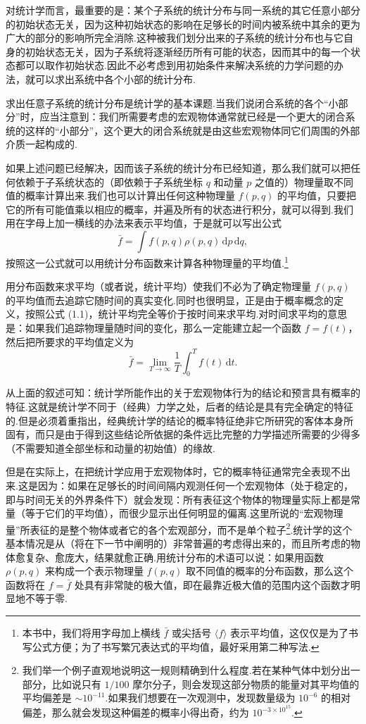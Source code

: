对统计学而言，最重要的是：某个子系统的统计分布与同一系统的其它任意小部分的初始状态无关，因为这种初始状态的影响在足够长的时间内被系统中其余的更为广大的部分的影响所完全消除.这种被我们划分出来的子系统的统计分布也与它自身的初始状态无关，因为子系统将逐渐经历所有可能的状态，因而其中的每一个状态都可以取作初始状态.因此不必考虑到用初始条件来解决系统的力学问题的办法，就可以求出系统中各个小部的统计分布.

求出任意子系统的统计分布是统计学的基本课题.当我们说闭合系统的各个“小部分”时，应当注意到：我们所需要考虑的宏观物体通常就已经是一个更大的闭合系统的这样的“小部分”，这个更大的闭合系统就是由这些宏观物体同它们周围的外部介质一起构成的.

如果上述问题已经解决，因而该子系统的统计分布已经知道，那么我们就可以把任何依赖于子系统状态的（即依赖于子系统坐标 $q$ 和动量 $p$ 之值的）物理量取不同值的概率计算出来.我们也可以计算出任何这种物理量 $f(p,q)$ 的平均值，只要把它的所有可能值乘以相应的概率，并遍及所有的状态进行积分，就可以得到.我们用在字母上加一横线的办法来表示平均值，于是就可以写出公式
\begin{equation}
  \bar{f}=\int f(p,q)\rho(p,q)\,\mathrm{d}p\,\mathrm{d}q,
\end{equation}
按照这一公式就可以用统计分布函数来计算各种物理量的平均值.\footnote{本书中，我们将用字母加上横线 $\bar{f}$ 或尖括号 $\langle f\rangle$ 表示平均值，这仅仅是为了书写公式方便；为了书写繁冗表达式的平均值，最好采用第二种写法.}

用分布函数来求平均（或者说，统计平均）使我们不必为了确定物理量 $f(p,q)$ 的平均值而去追踪它随时间的真实变化.同时也很明显，正是由于概率概念的定义，按照公式 (1.1)，统计平均完全等价于按时间来求平均.对时间求平均的意思是：如果我们追踪物理量随时间的变化，那么一定能建立起一个函数 $f=f(t)$，然后把所要求的平均值定义为
\begin{equation*}
  \bar{f}=\lim_{T\to\infty}\frac{1}{T}\int_0^{T}f(t)\,\mathrm{d}t.
\end{equation*}

从上面的叙述可知：统计学所能作出的关于宏观物体行为的结论和预言具有概率的特征.这就是统计学不同于（经典）力学之处，后者的结论是具有完全确定的特征的.但是必须着重指出，经典统计学的结论的概率特征绝非它所研究的客体本身所固有，而只是由于得到这些结论所依据的条件远比完整的力学描述所需要的少得多（不需要知道全部坐标和动量的初始值）的缘故.

但是在实际上，在把统计学应用于宏观物体时，它的概率特征通常完全表现不出来.这是因为：如果在足够长的时间间隔内观测任何一个宏观物体（处于稳定的，即与时间无关的外界条件下）就会发现：所有表征这个物体的物理量实际上都是常量（等于它们的平均值），而很少显示出任何明显的偏离.这里所说的“宏观物理量”所表征的是整个物体或者它的各个宏观部分，而不是单个粒子\footnote{我们举一个例子直观地说明这一规则精确到什么程度.若在某种气体中划分出一部分，比如说只有 $1/100$ 摩尔分子，则会发现这部分物质的能量对其平均值的平均偏差是 $\sim10^{-11}$.如果我们想要在一次观测中，发现数量级为 $10^{-6}$ 的相对偏差，那么就会发现这种偏差的概率小得出奇，约为 $10^{-3\times10^{15}}$.}.统计学的这个基本情况是从（将在下一节中阐明的）非常普遍的考虑得出来的，而且所考虑的物体愈复杂、愈庞大，结果就愈正确.用统计分布的术语可以说：如果用函数 $\rho(p,q)$ 来构成一个表示物理量 $f(p,q)$ 取不同值的概率的分布函数，那么这个函数将在 $f=\bar{f}$ 处具有非常陡的极大值，即在最靠近极大值的范围内这个函数才明显地不等于零.

